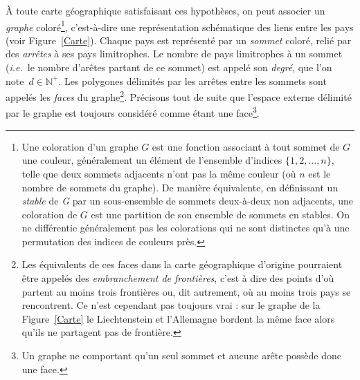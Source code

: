 À toute carte géographique satisfaisant ces hypothèses, on peut associer un \textit{graphe} coloré\footnote{Une coloration d'un graphe $G$ est une fonction associant à tout sommet de $G$ une couleur, généralement un élément de l'ensemble d'indices $\{1, 2, ..., n\}$, telle que deux sommets adjacents n'ont pas la même couleur (où $n$ est le nombre de sommets du graphe). De manière équivalente, en définissant un \textit{stable} de \textit{G} par un sous-ensemble de sommets deux-à-deux non adjacents, une coloration de $G$ est une partition de son ensemble de sommets en stables. On ne différentie généralement pas les colorations qui ne sont distinctes qu'à une permutation des indices de couleurs près.}, c'est-à-dire une représentation schématique des liens entre les pays (voir Figure~\ref{Carte}). Chaque pays est représenté par un \textit{sommet} coloré, relié par des \textit{arrêtes} à ses pays limitrophes. Le nombre de pays limitrophes à un sommet (\textit{i.e.}~le nombre d'arêtes partant de ce sommet) est appelé son \textit{degré}, que l'on note~$d\in\mathbb{N}^+$. Les polygones délimités par les arrêtes entre les sommets sont appelés les \textit{faces} du graphe\footnote{Les équivalents de ces faces dans la carte géographique d'origine pourraient être appelés des \textit{embranchement de frontières}, c'est à dire des points d'où partent au moins trois frontières ou, dit autrement, où au moins trois pays se rencontrent. Ce n'est cependant pas toujours vrai : sur le graphe de la Figure~\ref{Carte} le Liechtenstein et l'Allemagne bordent la même face alors qu'ils ne partagent pas de frontière.}. Précisons tout de suite que l'espace externe délimité par le graphe est toujours considéré comme étant une face\footnote{Un graphe ne comportant qu'un seul sommet et aucune arête possède donc une face.}.

\begin{figure}[b!]
\end{figure}

